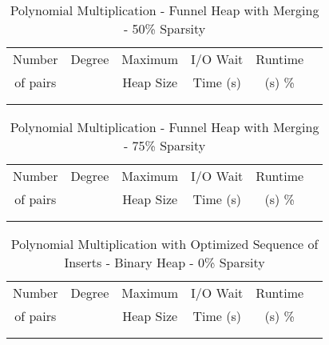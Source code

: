 \documentclass[11pt, one-sided]{amsart}
\begin{document}
\begin{table}[htbp]
   \centering
      \caption{Polynomial Multiplication - Funnel Heap with Merging - 50\% Sparsity}
   \begin{tabular}{|c|c|c|c|c|c|}
   	\hline
		 Number   & 	Degree	& Maximum & 	I/O Wait	&  Runtime 	 \\ 
		 of pairs 	&			& Heap Size	& 	Time (s)		&	(s)	 		\%				\\ \hline
		 		&			&			&			&						\\
		 		&			&			&			&						\\
   \end{tabular}
   \label{tab:booktabs}
\end{table}


\begin{table}[htbp]
   \centering
      \caption{Polynomial Multiplication - Funnel Heap with Merging - 75\% Sparsity}
   \begin{tabular}{|c|c|c|c|c|c|}
   	\hline
		 Number   & 	Degree	& Maximum & I/O Wait		& Runtime 	 \\ 
		 of pairs 	&			& Heap Size	& Time (s)		&	(s)		 		\%				\\ \hline
		 		&			&			&			&						\\
		 		&			&			&			&						\\
   \end{tabular}
   \label{tab:booktabs}
\end{table}


\newpage




\begin{table}[htbp]
   \centering
      \caption{Polynomial Multiplication with Optimized Sequence of Inserts - Binary Heap - 0\% Sparsity}
   \begin{tabular}{|c|c|c|c|c|c|}
   	\hline
		 Number   & 	Degree	& Maximum 	& I/O Wait		& Runtime 	 \\ 
		 of pairs 	&			& Heap Size	& Time (s)		&	(s)		 		\%				\\ \hline
				&			&			&			&						\\
				&			&			&			&						\\
   \end{tabular}
   \label{tab:booktabs}
\end{table}
\end{document}
